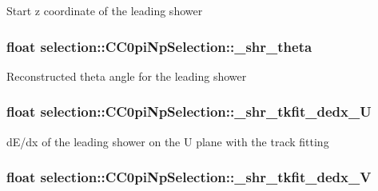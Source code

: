 Start z coordinate of the leading shower \hypertarget{classselection_1_1CC0piNpSelection_a624a38f7c8d33320df92e610fd0e16ee}{
\subsubsection[{\-\_\-shr\-\_\-theta}]{\setlength{\rightskip}{0pt plus 5cm}float selection\-::\-C\-C0pi\-Np\-Selection\-::\-\_\-shr\-\_\-theta\hspace{0.3cm}{\ttfamily [private]}}}\label{classselection_1_1CC0piNpSelection_a624a38f7c8d33320df92e610fd0e16ee}
Reconstructed theta angle for the leading shower \hypertarget{classselection_1_1CC0piNpSelection_aaaef69409457695e2300bf847a13804c}{
\subsubsection[{\-\_\-shr\-\_\-tkfit\-\_\-dedx\-\_\-\-U}]{\setlength{\rightskip}{0pt plus 5cm}float selection\-::\-C\-C0pi\-Np\-Selection\-::\-\_\-shr\-\_\-tkfit\-\_\-dedx\-\_\-\-U\hspace{0.3cm}{\ttfamily [private]}}}\label{classselection_1_1CC0piNpSelection_aaaef69409457695e2300bf847a13804c}
d\-E/dx of the leading shower on the U plane with the track fitting \hypertarget{classselection_1_1CC0piNpSelection_a428fc549513bea0e1ca92cf90c1148cd}{
\subsubsection[{\-\_\-shr\-\_\-tkfit\-\_\-dedx\-\_\-\-V}]{\setlength{\rightskip}{0pt plus 5cm}float selection\-::\-C\-C0pi\-Np\-Selection\-::\-\_\-shr\-\_\-tkfit\-\_\-dedx\-\_\-\-V\hspace{0.3cm}{\ttfamily [private]}}}\label{classselection_1_1CC0piNpSelection_a428fc549513bea0e1ca92cf90c1148cd}
